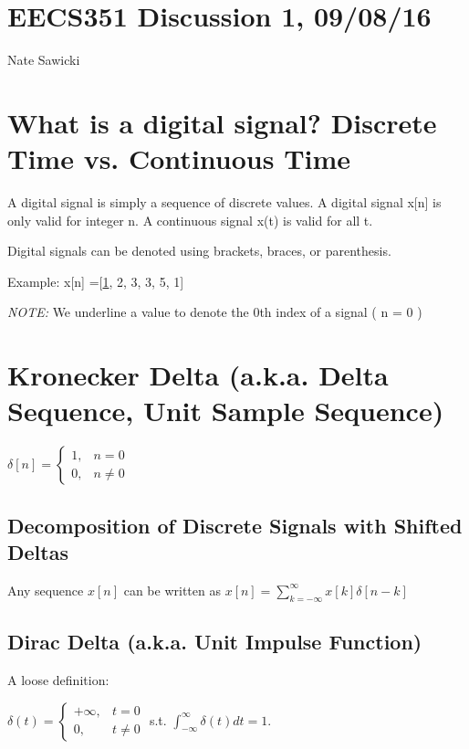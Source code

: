 \documentclass[11pt]{article}
\begin{document}
\section*{EECS351 Discussion 1, 09/08/16}
Nate Sawicki

\section{What is a digital signal? Discrete Time vs. Continuous Time}

A digital signal is simply a sequence of discrete values. A digital signal x[n] is only valid for integer n. A continuous signal x(t) is valid for all t.


Digital signals can be denoted using brackets, braces, or parenthesis.  \newline

Example: x[n] =[\underline{1}, 2, 3, 3, 5, 1]

\emph{NOTE:} We underline a value to denote the 0th index of a signal ( n = 0 )


\section{Kronecker Delta (a.k.a. Delta Sequence, Unit Sample Sequence)}

$\delta[n] = \begin{cases}1, & n = 0 \\ 0, & n\neq 0 \end{cases}$

\subsection{Decomposition of Discrete Signals with Shifted Deltas}
Any sequence $x[n]$ can be written as $x[n]=\sum\limits_{k=-\infty}^\infty x[k]\delta[n-k]$

\subsection{Dirac Delta (a.k.a. Unit Impulse Function)}

A loose definition:

$\delta(t) = \begin{cases} +\infty,& t = 0 \\ 0, & t \neq 0 \end{cases}$ \quad  s.t. $\int_{-\infty}^\infty \delta(t) dt = 1$.
\end{document}
